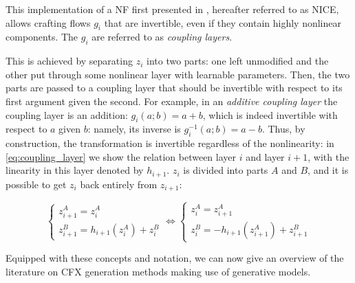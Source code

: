 \documentclass[../main.tex]{subfiles}
\begin{document}
This implementation of a NF first presented in \cite{dinhNICE2015}, hereafter referred to as NICE, allows crafting flows $g_i$ that are invertible, even if they contain highly nonlinear components.
The $g_i$ are referred to as \emph{coupling layers}.

This is achieved by separating $z_i$ into two parts: one left unmodified and the other put through some nonlinear layer with learnable parameters.
Then, the two parts are passed to a coupling layer that should be invertible with respect to its first argument given the second.
For example, in an \emph{additive coupling layer} the coupling layer is an addition: $g_i(a; b) = a + b$, which is indeed invertible with respect to $a$ given $b$: namely, its inverse is $g_i^{-1}(a; b) = a - b$.
Thus, by construction, the transformation is invertible regardless of the nonlinearity: in \autoref{eq:coupling_layer} we show the relation between layer $i$ and layer $i+1$, with the linearity in this layer denoted by $h_{i+1}$. $z_i$ is divided into parts $A$ and $B$, and it is possible to get $z_i$ back entirely from $z_{i+1}$:

\begin{equation}
    \label{eq:coupling_layer}
    \begin{cases}
        z_{i+1}^A = z_i^A \\
        z_{i+1}^B = h_{i+1}(z_i^A) + z_i^B
    \end{cases}
    \Leftrightarrow
    \begin{cases}
        z_i^A = z_{i+1}^A \\
        z_i^B = -h_{i+1}(z_{i+1}^A) + z_{i+1}^B
    \end{cases}
\end{equation}

Equipped with these concepts and notation, we can now give an overview of the literature on CFX generation methods making use of generative models.
\end{document}
